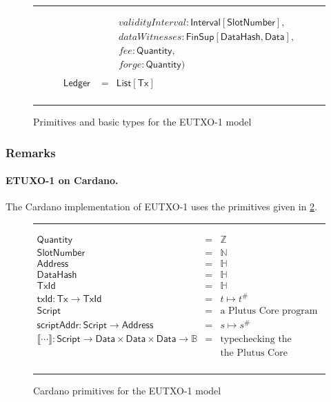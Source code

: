 \documentclass[a4paper]{article}
\renewcommand{\i}{\textit}  %
\newcommand{\s}{\textsf}  %
\newcommand{\msf}[1]{\ensuremath{\mathsf{#1}}}
\newcommand{\mi}[1]{\ensuremath{\mathit{#1}}}
\newcommand\rfskip{7pt}
\newenvironment{ruledfigure}[1]{\begin{figure}[#1]\hrule\vspace{\rfskip}}{\vspace{\rfskip}\hrule\end{figure}}
\newcommand{\hash}[1]{\ensuremath{#1^{\#}}}
\newcommand{\List}[1]{\ensuremath{\s{List}[#1]}}
\newcommand{\Interval}[1]{\ensuremath{\s{Interval}[#1]}}
\newcommand{\FinSup}[2]{\ensuremath{\s{FinSup}[#1,#2]}}
\newcommand{\script}{\ensuremath{\s{Script}}}
\newcommand{\scriptAddr}{\msf{scriptAddr}}
\newcommand{\TxId}{\ensuremath{\s{TxId}}}
\newcommand{\txId}{\msf{txId}}
\newcommand{\Address}{\ensuremath{\s{Address}}}
\newcommand{\DataHash}{\ensuremath{\s{DataHash}}}
\newcommand{\forge}{\mi{forge}}
\newcommand{\fee}{\mi{fee}}
\newcommand{\dataWits}{\mi{dataWitnesses}}
\newcommand{\Data}{\ensuremath{\s{Data}}}
\newcommand{\slotnum}{\ensuremath{\s{SlotNumber}}}
\newcommand{\eutxotx}{\msf{Tx}}
\newcommand{\qty}{\ensuremath{\s{Quantity}}}
\newcommand\B{\ensuremath{\mathbb{B}}}
\newcommand\N{\ensuremath{\mathbb{N}}}
\newcommand\Z{\ensuremath{\mathbb{Z}}}
\renewcommand\H{\ensuremath{\mathbb{H}}}
\begin{document}
\begin{ruledfigure}{H}
\begin{displaymath}
\begin{array}{rll}
                   & &\ \i{validityInterval}: \Interval{\slotnum},\\
                   & &\ \dataWits: \FinSup{\DataHash}{\Data},\\
                   & &\ \fee: \qty,\\
                   & &\ \forge: \qty) \\
     \\
     \s{Ledger } &=&\!\List{\eutxotx}\\
  \end{array}
  \end{displaymath}
  \caption{Primitives and basic types for the EUTXO-1 model}
  \label{fig:eutxo-1-types}
\end{ruledfigure}

\subsubsection{Remarks}
\paragraph{ETUXO-1 on Cardano.}
The Cardano implementation of EUTXO-1 uses the primitives given in
\cref{fig:eutxo-1-types-cardano}.

\begin{ruledfigure}{H}
  \begin{displaymath}
  \begin{array}{rll}
    \qty{} &=& \Z\\
    \slotnum &=& \N\\
    \Address &=& \H\\
    \DataHash &=& \H\\
    \TxId &=& \H\\
    \txId : \eutxotx \rightarrow \TxId &=& t \mapsto \hash{t}\\
    \script &=& \mbox{a Plutus Core program}\\
    \scriptAddr : \script \rightarrow \Address &=& s \mapsto \hash{s}\\
    \llbracket \cdots \rrbracket : \script \rightarrow \Data \times \Data \times
    \Data \rightarrow \B &=& \mbox{typechecking the program and running}\\
                             &&\mbox{the Plutus Core interpreter}\\
  \end{array}
  \end{displaymath}
  \caption{Cardano primitives for the EUTXO-1 model}
  \label{fig:eutxo-1-types-cardano}
\end{ruledfigure}
\end{document}
